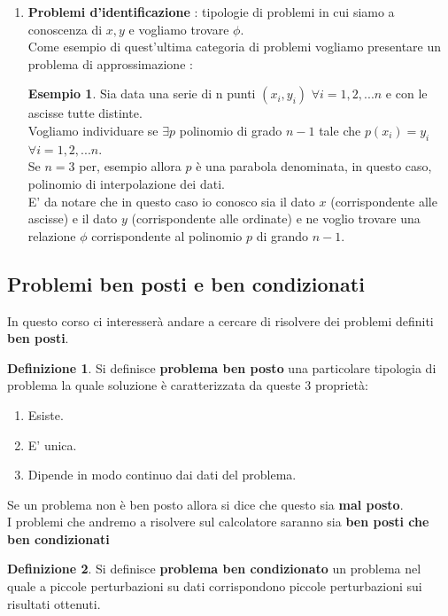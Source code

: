 \documentclass[12pt, a4paper]{book}
\theoremstyle{definition}
\newtheorem{exmp}{Esempio}[section]
\newtheorem{defn}{Definizione}[section]
\begin{document}
\begin{flushleft}
\begin{enumerate}
\item \textbf{Problemi d'identificazione} : tipologie di problemi in cui siamo a conoscenza di $x, y$ e vogliamo trovare $\phi$.\\
Come esempio di quest'ultima categoria di problemi vogliamo presentare un problema di approssimazione :
\begin{exmp}
Sia data una serie di n punti $(x_{i}, y_{i})$ $\forall i = 1,2, ...  n$ e con le ascisse tutte distinte. \\
Vogliamo individuare se $\exists p $ polinomio di grado $n-1$ tale che $p(x_{i}) = y_{i}$ $\forall i = 1,2, ...  n$.\\
Se $n = 3$ per,  esempio allora $p$ è una parabola denominata,  in questo caso,  polinomio di interpolazione dei dati. \\
E' da notare che in questo caso io conosco sia il dato $x$ (corrispondente alle ascisse) e il dato $y$ (corrispondente alle ordinate) e ne voglio trovare una relazione $\phi$ corrispondente al polinomio $p$ di grando $n-1$.
\end{exmp}
\end{enumerate}
\end{flushleft}

\subsection{Problemi ben posti e ben condizionati}
\begin{flushleft}

In questo corso ci interesserà andare a cercare di risolvere dei problemi definiti \textbf{ben posti}.

\begin{defn}
Si definisce \textbf{problema ben posto} una particolare tipologia di problema la quale soluzione è caratterizzata da queste 3 proprietà: 
\begin{enumerate}
\item Esiste.
\item E' unica.
\item Dipende in modo continuo dai dati del problema.
\end{enumerate}
\end{defn}
Se un problema non è ben posto allora si dice che questo sia \textbf{mal posto}.\\
I problemi che andremo a risolvere sul calcolatore saranno sia \textbf{ben posti che ben condizionati}
\begin{defn}
Si definisce \textbf{problema ben condizionato} un problema nel quale a piccole perturbazioni su dati corrispondono piccole perturbazioni sui risultati ottenuti.
\end{defn}
\end{flushleft}
\end{document}
